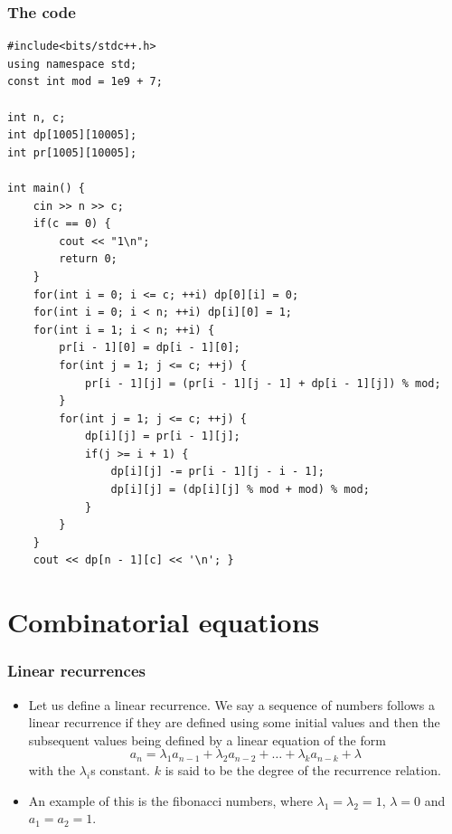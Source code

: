 \documentclass{beamer}
\begin{document}
\begin{frame}
\frametitle{The code}

\begin{tiny}
\begin{verbatim}
#include<bits/stdc++.h>
using namespace std;
const int mod = 1e9 + 7;

int n, c;
int dp[1005][10005];
int pr[1005][10005];

int main() {
    cin >> n >> c;
    if(c == 0) {
        cout << "1\n";
        return 0;
    }
    for(int i = 0; i <= c; ++i) dp[0][i] = 0;
    for(int i = 0; i < n; ++i) dp[i][0] = 1;
    for(int i = 1; i < n; ++i) {
        pr[i - 1][0] = dp[i - 1][0];
        for(int j = 1; j <= c; ++j) {
            pr[i - 1][j] = (pr[i - 1][j - 1] + dp[i - 1][j]) % mod;
        }
        for(int j = 1; j <= c; ++j) {
            dp[i][j] = pr[i - 1][j];
            if(j >= i + 1) {
                dp[i][j] -= pr[i - 1][j - i - 1];
                dp[i][j] = (dp[i][j] % mod + mod) % mod;
            }
        }
    }
    cout << dp[n - 1][c] << '\n'; }
\end{verbatim}
\end{tiny}

\end{frame}

\section*{Combinatorial equations}

\begin{frame}[plain]
\frametitle{Linear recurrences}

\begin{itemize}

\item Let us define a linear recurrence. We say a sequence of numbers follows a linear recurrence if they are defined using some initial values and then the subsequent values being defined by a linear equation of the form
\[a_n = \lambda_1 a_{n - 1} + \lambda_2 a_{n - 2} + \dots + \lambda_k a_{n - k} + \lambda\]
with the $\lambda_i$s constant. $k$ is said to be the degree of the recurrence relation.

\item An example of this is the fibonacci numbers, where $\lambda_1 = \lambda_2 = 1$, $\lambda = 0$ and $a_1 = a_2 = 1$.

\end{itemize}

\end{frame}
\end{document}
